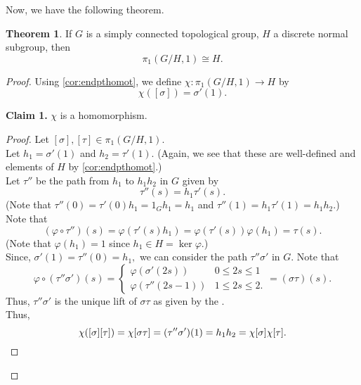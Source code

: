 \documentclass[12pt]{article}
\theoremstyle{definition}
\newtheorem{thm}{Theorem}
\numberwithin{thm}{section}
\newenvironment{blockquote}
{\begin{mdframed}[skipabove=0pt, skipbelow=0pt, innertopmargin=4pt, innerbottommargin=4pt, bottomline=false,topline=false,rightline=false, linewidth=2pt]}
{\end{mdframed}}
\begin{document}
Now, we have the following theorem.
\begin{thm}
	If $G$ is a simply connected topological group, $H$ a discrete normal subgroup, then
	\begin{equation*} 
		\pi_1(G/H, 1) \cong H.
	\end{equation*}
\end{thm}
\begin{proof} 
	Using \cref{cor:endpthomot}, we define $\chi:\pi_1(G/H, 1) \to H$ by
	\begin{equation*} 
		\chi([\sigma]) = \sigma'(1).
	\end{equation*}
	\begin{blockquote}
		\textbf{Claim 1.} $\chi$ is a homomorphism.
		\begin{proof} 
			Let $[\sigma], [\tau] \in \pi_1(G/H, 1).$\\
			Let $h_1 = \sigma'(1)$ and $h_2 = \tau'(1).$ (Again, we see that these are well-defined and elements of $H$ by \cref{cor:endpthomot}.) \\
			Let $\tau''$ be the path from $h_1$ to $h_1h_2$ in $G$ given by
			\begin{equation*} 
				\tau''(s) = h_1\tau'(s).
			\end{equation*}
			(Note that $\tau''(0) = \tau'(0)h_1 = 1_Gh_1 = h_1$ and $\tau''(1) = h_1\tau'(1) = h_1h_2.$)\\
			Note that
			\begin{equation*} 
				(\varphi\circ\tau'')(s) = \varphi(\tau'(s)h_1) = \varphi(\tau'(s))\varphi(h_1) = \tau(s).
			\end{equation*}
			(Note that $\varphi(h_1) = 1$ since $h_1 \in H = \ker\varphi.$)\\
			Since, $\sigma'(1) = \tau''(0) = h_1,$ we can consider the path $\tau''\sigma'$ in $G.$ Note that
			\begin{equation*} 
				\varphi\circ(\tau''\sigma')(s) = \begin{cases}
					\varphi(\sigma'(2s)) & 0 \le 2s \le 1\\
					\varphi(\tau''(2s - 1)) & 1 \le 2s \le 2.
				\end{cases} = (\sigma\tau)(s).
			\end{equation*}
			Thus, $\tau''\sigma'$ is the unique lift of $\sigma\tau$ as given by the . \\
			Thus,
			\begin{equation*} 
				\chi([\sigma][\tau]) = \chi[\sigma\tau] = (\tau''\sigma')(1) = h_1h_2 = \chi[\sigma]\chi[\tau]. \qedhere
			\end{equation*}


\end{proof}
\end{blockquote}
\end{proof}
\end{document}

